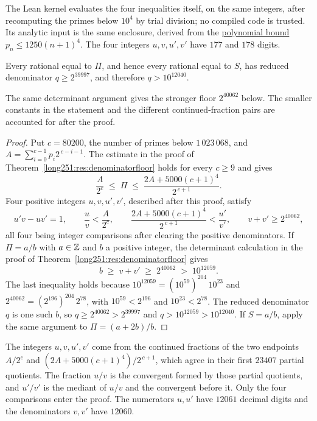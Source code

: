 \documentclass[11pt]{article}
\begin{document}
\noindent The Lean kernel evaluates the four inequalities itself, on the
same integers, after recomputing the primes below $10^4$ by trial
division; no compiled code is trusted.  Its analytic input is the same
enclosure, derived from the
\href{https://github.com/wcook04/plectis-erdos/blob/3d6d938d696fed0fb71dd55115a18a73738ff223/lean/ErdosProblems/Erdos251/PrimeGapDyadicTail.lean\#L360}{polynomial
bound} $p_n\le1250(n+1)^4$.  The four integers $u,v,u',v'$ have $177$
and $178$ digits.

\begin{theorem}\label{long251:res:cfexclusion}
Every rational equal to $\Pi$, and hence every rational equal to $S$, has
reduced denominator $q\ge2^{39997}$, and therefore $q>10^{12040}$.
\end{theorem}

The same determinant argument gives the stronger floor $2^{40062}$
below.  The smaller constants in the statement and the different
continued-fraction pairs are accounted for after the proof.

\begin{proof}
Put $c=80200$, the number of primes below $1\,023\,068$, and
$A=\sum_{i=0}^{c-1}p_i2^{\,c-i-1}$.  The estimate in the proof of
Theorem~\ref{long251:res:denominatorfloor} holds for every $c\ge9$ and gives
\[
 \frac{A}{2^{c}}\;\le\;\Pi\;\le\;\frac{2A+5000(c+1)^4}{2^{\,c+1}} .
\]
Four positive integers $u,v,u',v'$, described after this proof, satisfy
\[
 u'v-uv'=1,\qquad
 \frac uv<\frac{A}{2^{c}},\qquad
 \frac{2A+5000(c+1)^4}{2^{\,c+1}}<\frac{u'}{v'},\qquad
 v+v'\ge2^{40062},
\]
all four being integer comparisons after clearing the positive denominators.
If $\Pi=a/b$ with $a\in\mathbb{Z}$ and $b$ a positive integer, the determinant
calculation in the proof of Theorem~\ref{long251:res:denominatorfloor} gives
\[
 b\;\ge\;v+v'\;\ge\;2^{40062}\;>\;10^{12059}.
\]
The last inequality holds because $10^{12059}=(10^{59})^{204}\,10^{23}$ and
$2^{40062}=(2^{196})^{204}\,2^{78}$, with $10^{59}<2^{196}$ and
$10^{23}<2^{78}$.  The reduced denominator $q$ is one such $b$, so
$q\ge2^{40062}>2^{39997}$ and $q>10^{12059}>10^{12040}$.  If $S=a/b$, apply
the same argument to $\Pi=(a+2b)/b$.
\end{proof}

\noindent The integers $u,v,u',v'$ come from the continued fractions of the
two endpoints $A/2^{c}$ and $(2A+5000(c+1)^4)/2^{\,c+1}$, which agree in their
first $23407$ partial quotients.  The fraction $u/v$ is the convergent formed by
those partial quotients, and $u'/v'$ is the mediant of $u/v$ and the convergent
before it.  Only the four comparisons enter the proof.  The numerators $u,u'$
have $12061$ decimal digits and the denominators $v,v'$ have $12060$.
\end{document}
